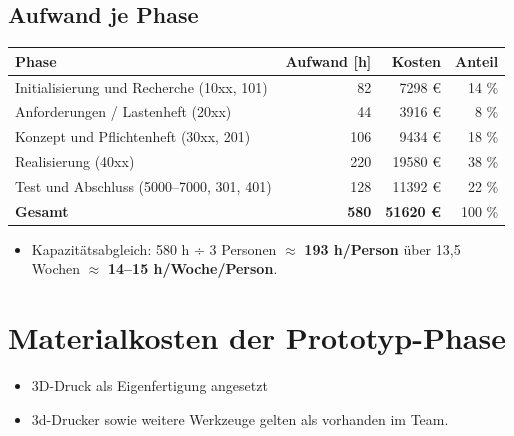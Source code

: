 \documentclass[
  a4paper,
  12pt,
  DIV=12,        %
  parskip=half,  %
  headings=small %
]{scrartcl}
\theoremstyle{definition}
\theoremstyle{definition}
\begin{document}
\hspace{4cm}

\subsection{Aufwand je Phase}

\begin{tabularx}{\textwidth}{X@{}rrr}
\toprule
\textbf{Phase} & \textbf{Aufwand [h]} & \textbf{Kosten} & \textbf{Anteil} \\
\midrule
Initialisierung und Recherche (10xx, 101) & 82 & 7298 \euro& 14 \% \\
Anforderungen / Lastenheft (20xx) & 44 & 3916 \euro & 8 \% \\
Konzept und Pflichtenheft (30xx, 201) & 106 & 9434 \euro & 18 \% \\
Realisierung (40xx) & 220 & 19580 \euro & 38 \% \\
Test und Abschluss (5000–7000, 301, 401) & 128 & 11392 \euro & 22 \% \\
\textbf{Gesamt} & \textbf{580} & \textbf{51620 \euro } &  100 \% \\
\bottomrule
\end{tabularx}

\begin{itemize}
\item Kapazitätsabgleich: 580 h ÷ 3 Personen $\approx$ \textbf{193 h/Person} über 13,5 Wochen 
$\approx$ \textbf{14–15 h/Woche/Person}. 
\end{itemize}



\section{Materialkosten der Prototyp-Phase}
\label{matkostenprototyp}

\begin{itemize}
\item 3D-Druck als Eigenfertigung angesetzt
\item 3d-Drucker sowie weitere Werkzeuge gelten als vorhanden im Team. 
\end{itemize}
\end{document}

